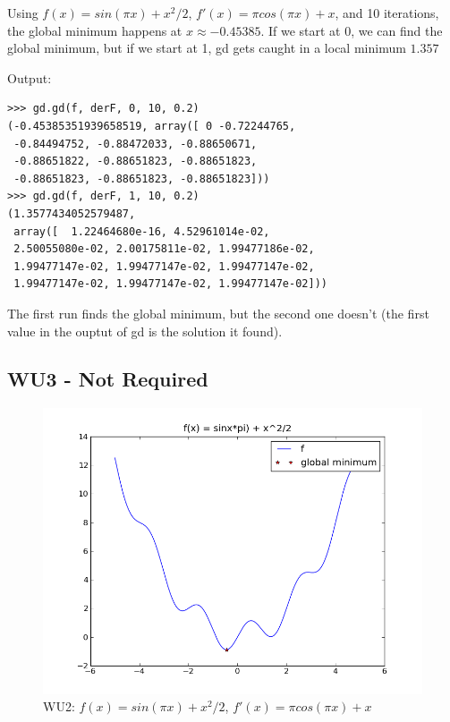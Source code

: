 \documentclass[a4paper,11pt]{article}
\begin{document}
Using $f(x) = sin(\pi x) + x^2/2$, $f'(x) = \pi cos(\pi x) + x$, and
10 iterations, the
global minimum happens at $x\approx -0.45385$.
If we start at 0, we can find the global minimum, but if we start at
1, gd gets caught in a local minimum $1.357$

Output:
\begin{verbatim}
>>> gd.gd(f, derF, 0, 10, 0.2)
(-0.45385351939658519, array([ 0 -0.72244765, 
 -0.84494752, -0.88472033, -0.88650671, 
 -0.88651822, -0.88651823, -0.88651823, 
 -0.88651823, -0.88651823, -0.88651823]))
>>> gd.gd(f, derF, 1, 10, 0.2)
(1.3577434052579487, 
 array([  1.22464680e-16, 4.52961014e-02,
 2.50055080e-02, 2.00175811e-02, 1.99477186e-02, 
 1.99477147e-02, 1.99477147e-02, 1.99477147e-02, 
 1.99477147e-02, 1.99477147e-02, 1.99477147e-02]))
\end{verbatim}

The first run finds the global minimum, but the second one
doesn't (the first value in the ouptut of gd is the solution it found).

\subsection{WU3 - Not Required}

\newpage

\begin{figure}[!ht]
  \begin{center}
  \includegraphics[width=5in]{wu2.png}
  \caption{WU2: $f(x) = sin(\pi x) + x^2/2$, $f'(x) = \pi cos(\pi x) + x$}
  \end{center}
\end{figure}
\end{document}
